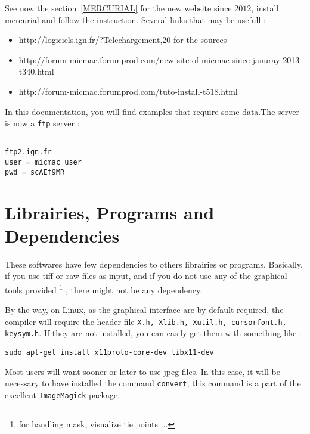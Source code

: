 See now the section~\ref{MERCURIAL} for the new website since $2012$, install mercurial and follow the instruction. 
Several links that may be usefull :

\begin{itemize}
   \item http://logiciels.ign.fr/?Telechargement,20   for the sources
   \item http://forum-micmac.forumprod.com/new-site-of-micmac-since-januray-2013-t340.html   
   \item http://forum-micmac.forumprod.com/tuto-install-t518.html
\end{itemize}


In this documentation, you will find examples that require some
data.The server is now a {\tt ftp} server :

\begin{verbatim}

ftp2.ign.fr
user = micmac_user
pwd = scAEf9MR

\end{verbatim}





\section{Librairies, Programs and Dependencies}

These softwares have few dependencies to others librairies or programs. Basically,
if you use tiff or raw files as input, and if you do not use any of the graphical
tools provided \footnote{for handling mask, visualize tie points ...} ,
there might not be any dependency. 

By the way, on Linux, as the graphical interface are by default required, the compiler
will require the header file {\tt X.h, Xlib.h, Xutil.h, cursorfont.h, keysym.h}.
If they are not installed, you can easily get them  with something like :


\begin{verbatim}
sudo apt-get install x11proto-core-dev libx11-dev
\end{verbatim}

Most users will want sooner or later to use jpeg files. In this case, it will be necessary
to have installed the command {\tt convert}, this command is a part of the excellent
{\tt ImageMagick} package.


